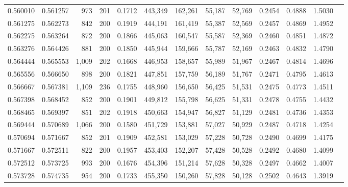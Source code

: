 \begin{tabular}{rrrrrrrrrrrrr}
0.560010 & 0.561257 &    973 &   201 &                                     0.1712 & 443,349 & 162,261 &  55,187 &  52,769 & 0.2454 & 0.4888 & 1.5030 \\
0.561275 & 0.562273 &    842 &   200 &                                     0.1919 & 444,191 & 161,419 &  55,387 &  52,569 & 0.2457 & 0.4869 & 1.4952 \\
0.562275 & 0.563264 &    872 &   200 &                                     0.1866 & 445,063 & 160,547 &  55,587 &  52,369 & 0.2460 & 0.4851 & 1.4872 \\
0.563276 & 0.564426 &    881 &   200 &                                     0.1850 & 445,944 & 159,666 &  55,787 &  52,169 & 0.2463 & 0.4832 & 1.4790 \\
0.564444 & 0.565553 &  1,009 &   202 &                                     0.1668 & 446,953 & 158,657 &  55,989 &  51,967 & 0.2467 & 0.4814 & 1.4696 \\
0.565556 & 0.566650 &    898 &   200 &                                     0.1821 & 447,851 & 157,759 &  56,189 &  51,767 & 0.2471 & 0.4795 & 1.4613 \\
0.566667 & 0.567381 &  1,109 &   236 &                                     0.1755 & 448,960 & 156,650 &  56,425 &  51,531 & 0.2475 & 0.4773 & 1.4511 \\
0.567398 & 0.568452 &    852 &   200 &                                     0.1901 & 449,812 & 155,798 &  56,625 &  51,331 & 0.2478 & 0.4755 & 1.4432 \\
0.568465 & 0.569397 &    851 &   202 &                                     0.1918 & 450,663 & 154,947 &  56,827 &  51,129 & 0.2481 & 0.4736 & 1.4353 \\
0.569444 & 0.570689 &  1,066 &   200 &                                     0.1580 & 451,729 & 153,881 &  57,027 &  50,929 & 0.2487 & 0.4718 & 1.4254 \\
0.570694 & 0.571667 &    852 &   201 &                                     0.1909 & 452,581 & 153,029 &  57,228 &  50,728 & 0.2490 & 0.4699 & 1.4175 \\
0.571667 & 0.572511 &    822 &   200 &                                     0.1957 & 453,403 & 152,207 &  57,428 &  50,528 & 0.2492 & 0.4680 & 1.4099 \\
0.572512 & 0.573725 &    993 &   200 &                                     0.1676 & 454,396 & 151,214 &  57,628 &  50,328 & 0.2497 & 0.4662 & 1.4007 \\
0.573728 & 0.574735 &    954 &   200 &                                     0.1733 & 455,350 & 150,260 &  57,828 &  50,128 & 0.2502 & 0.4643 & 1.3919 \\

\end{tabular}
